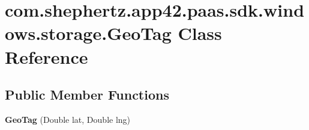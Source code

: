 \hypertarget{classcom_1_1shephertz_1_1app42_1_1paas_1_1sdk_1_1windows_1_1storage_1_1_geo_tag}{\section{com.\+shephertz.\+app42.\+paas.\+sdk.\+windows.\+storage.\+Geo\+Tag Class Reference}
\label{classcom_1_1shephertz_1_1app42_1_1paas_1_1sdk_1_1windows_1_1storage_1_1_geo_tag}
}
\subsection*{Public Member Functions}
\begin{DoxyCompactItemize}
\item 
\hypertarget{classcom_1_1shephertz_1_1app42_1_1paas_1_1sdk_1_1windows_1_1storage_1_1_geo_tag_a9e5a04373dc9f7b5295c2c14886e464d}{{\bfseries Geo\+Tag} (Double lat, Double lng)}\label{classcom_1_1shephertz_1_1app42_1_1paas_1_1sdk_1_1windows_1_1storage_1_1_geo_tag_a9e5a04373dc9f7b5295c2c14886e464d}


\end{DoxyCompactItemize}
